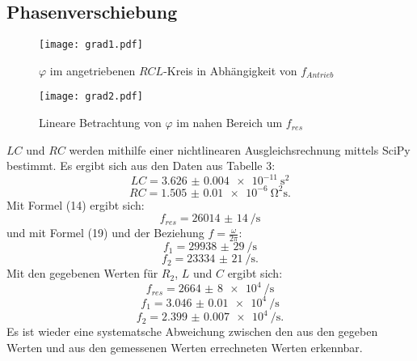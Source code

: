 \subsection{Phasenverschiebung}
\begin{figure}[H]
	\centering
	\caption{$\varphi$ im angetriebenen $RCL$-Kreis in Abhängigkeit von $f_{Antrieb}$ }
	\texttt{[image: grad1.pdf]}
	\label{fig:grad1}
\end{figure}
\begin{figure}[H]
	\centering
	\caption{Lineare Betrachtung von $\varphi$ im nahen Bereich um $f_{res}$}
	\texttt{[image: grad2.pdf]}
	\label{fig:grad2}
\end{figure}

$LC$ und $RC$ werden mithilfe einer nichtlinearen Ausgleichsrechnung mittels SciPy \cite{scipy} bestimmt. Es ergibt sich aus den Daten aus Tabelle 3:
\begin{displaymath}
LC = \SI{3.626(4)e-11}{\second\squared}
\end{displaymath}
\begin{displaymath}
RC = \SI{1.505(10)e-6}{\ohm\squared\second}\text{.}
\end{displaymath}
Mit Formel (14) ergibt sich:
\begin{displaymath}
f_{res} = \SI{26014(14)}{\per\second}
\end{displaymath}
und mit Formel (19) und der Beziehung $f = \frac{\omega}{2\pi}$:
\begin{displaymath}
f_1 = \SI{29938(29)}{\per\second}
\end{displaymath}
\begin{displaymath}
f_2 = \SI{23334(21)}{\per\second}\text{.}
\end{displaymath}
Mit den gegebenen Werten für $R_2$, $L$ und $C$ ergibt sich:
\begin{displaymath}
f_{res} = \SI{2664(8)e4}{\per\second}
\end{displaymath}
\begin{displaymath}
f_1 = \SI{3.046(10)e4}{\per\second}
\end{displaymath}
\begin{displaymath}
f_2 = \SI{2.399(7)e4}{\per\second}\text{.}
\end{displaymath}
Es ist wieder eine systematsche Abweichung zwischen den aus den gegeben Werten und aus den gemessenen Werten errechneten Werten erkennbar.


